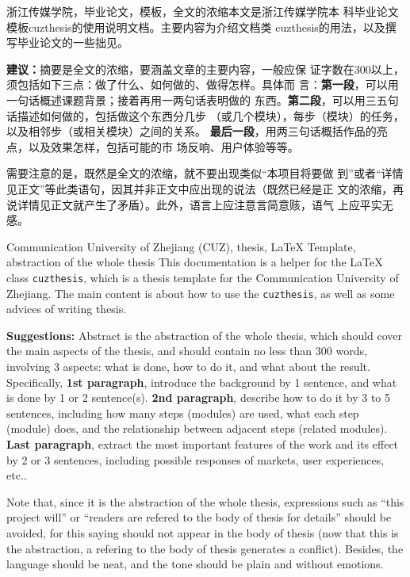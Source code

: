 \begin{chineseabstract}
    {浙江传媒学院，毕业论文，模板，全文的浓缩}本文是浙江传媒学院本
    科毕业论文模板cuzthesis的使用说明文档。主要内容为介绍文档类
    cuzthesis的用法，以及撰写毕业论文的一些拙见。

    \begin{leftbar}
        \noindent\textbf{建议：}摘要是全文的浓缩，要涵盖文章的主要内容，一般应保
        证字数在300以上，须包括如下三点：做了什么、如何做的、做得怎样。具体而
        言：\textbf{第一段}，可以用一句话概述课题背景；接着再用一两句话表明做的
        东西。\textbf{第二段}，可以用三五句话描述如何做的，包括做这个东西分几步
        （或几个模块），每步（模块）的任务，以及相邻步（或相关模块）之间的关系。
        \textbf{最后一段}，用两三句话概括作品的亮点，以及效果怎样，包括可能的市
        场反响、用户体验等等。
        
        \noindent{}需要注意的是，既然是全文的浓缩，就不要出现类似“本项目将要做
        到”或者“详情见正文”等此类语句，因其并非正文中应出现的说法（既然已经是正
        文的浓缩，再说详情见正文就产生了矛盾）。此外，语言上应注意言简意赅，语气
        上应平实无感。
    \end{leftbar}
\end{chineseabstract}
\begin{englishabstract}
    {Communication University of Zhejiang (CUZ), thesis, \LaTeX{} Template,
    abstraction of the whole thesis} This documentation is a helper for the
    \LaTeX{} class \texttt{cuzthesis}, which is a thesis template for the
    Communication University of Zhejiang. The main content is about how to use
    the \texttt{cuzthesis}, as well as some advices of writing thesis.

    \begin{leftbar}
        \noindent\textbf{Suggestions:} Abstract is the abstraction of the whole
        thesis, which should cover the main aspects of the thesis, and should
        contain no less than 300 words, involving 3 aspects: what is done, how
        to do it, and what about the result. Specifically, \textbf{1st
        paragraph}, introduce the background by 1 sentence, and what is done by
        1 or 2 sentence(s). \textbf{2nd paragraph}, describe how to do it by 3
        to 5 sentences, including how many steps (modules) are used, what each
        step (module) does, and the relationship between adjacent steps (related
        modules). \textbf{Last paragraph}, extract the most important features
        of the work and its effect by 2 or 3 sentences, including possible
        responses of markets, user experiences, etc..
    	
    	\noindent Note that, since it is the abstraction of the whole thesis,
    	expressions such as ``this project will'' or ``readers are refered to
    	the body of thesis for details'' should be avoided, for this saying
    	should not appear in the body of thesis (now that this is the
    	abstraction, a refering to the body of thesis generates a conflict).
    	Besides, the language should be neat, and the tone should be plain and
    	without emotions.
    \end{leftbar}
\end{englishabstract}